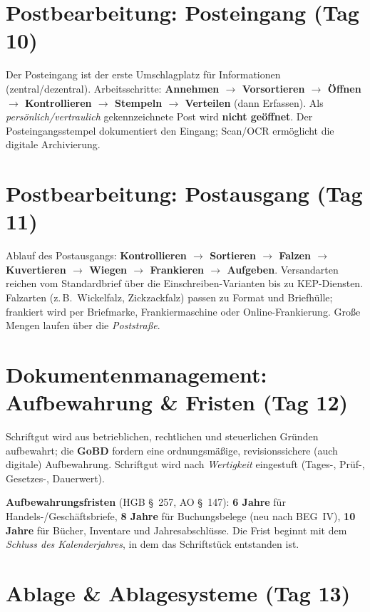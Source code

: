\documentclass[11pt, a4paper]{article}
\begin{document}
\section{Postbearbeitung: Posteingang (Tag 10)}

Der Posteingang ist der erste Umschlagplatz für Informationen (zentral/dezentral).
Arbeitsschritte: \textbf{Annehmen $\rightarrow$ Vorsortieren $\rightarrow$ Öffnen
$\rightarrow$ Kontrollieren $\rightarrow$ Stempeln $\rightarrow$ Verteilen} (dann Erfassen).
Als \emph{persönlich/vertraulich} gekennzeichnete Post wird \textbf{nicht geöffnet}.
Der Posteingangsstempel dokumentiert den Eingang; Scan/OCR ermöglicht die digitale
Archivierung.

\section{Postbearbeitung: Postausgang (Tag 11)}

Ablauf des Postausgangs: \textbf{Kontrollieren $\rightarrow$ Sortieren $\rightarrow$
Falzen $\rightarrow$ Kuvertieren $\rightarrow$ Wiegen $\rightarrow$ Frankieren
$\rightarrow$ Aufgeben}. Versandarten reichen vom Standardbrief über die
Einschreiben-Varianten bis zu KEP-Diensten. Falzarten (z.\,B.\ Wickelfalz, Zickzackfalz)
passen zu Format und Briefhülle; frankiert wird per Briefmarke, Frankiermaschine oder
Online-Frankierung. Große Mengen laufen über die \emph{Poststraße}.

\section{Dokumentenmanagement: Aufbewahrung \& Fristen (Tag 12)}

Schriftgut wird aus betrieblichen, rechtlichen und steuerlichen Gründen aufbewahrt; die
\textbf{GoBD} fordern eine ordnungsmäßige, revisionssichere (auch digitale) Aufbewahrung.
Schriftgut wird nach \emph{Wertigkeit} eingestuft (Tages-, Prüf-, Gesetzes-, Dauerwert).

\begin{merksatz}
\textbf{Aufbewahrungsfristen} (HGB \S~257, AO \S~147): \textbf{6 Jahre} für Handels-/Geschäftsbriefe,
\textbf{8 Jahre} für Buchungsbelege (neu nach BEG~IV), \textbf{10 Jahre} für Bücher,
Inventare und Jahresabschlüsse. Die Frist beginnt mit dem \emph{Schluss des Kalenderjahres},
in dem das Schriftstück entstanden ist.
\end{merksatz}

\section{Ablage \& Ablagesysteme (Tag 13)}
\end{document}
